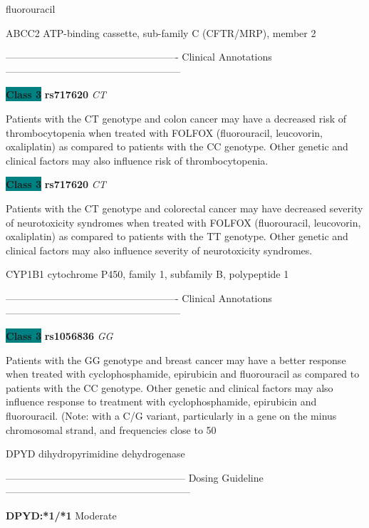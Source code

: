 \documentclass{resume} %
\begin{document}
\begin{rSection}{ fluorouracil }
\begin{rSubsection}{ ABCC2 }{ ATP-binding cassette, sub-family C (CFTR/MRP), member 2 }{}{}
\item[] ---------------------------------------------------- Clinical Annotations -----------------------------------------------------\newline
\item \textbf{\colorbox{teal} {Class 3}} \textbf{ rs717620 } \textit{ CT }
\item[] Patients with the CT genotype and colon cancer may have a decreased risk of thrombocytopenia when treated with FOLFOX (fluorouracil, leucovorin, oxaliplatin) as compared to patients with the CC genotype. Other genetic and clinical factors may also influence risk of thrombocytopenia.\item \textbf{\colorbox{teal} {Class 3}} \textbf{ rs717620 } \textit{ CT }
\item[] Patients with the CT genotype and colorectal cancer may have decreased severity of neurotoxicity syndromes when treated with FOLFOX (fluorouracil, leucovorin, oxaliplatin) as compared to patients with the TT genotype. Other genetic and clinical factors may also influence severity of neurotoxicity syndromes.
\end{rSubsection}\begin{rSubsection}{ CYP1B1 }{ cytochrome P450, family 1, subfamily B, polypeptide 1 }{}{}
\item[]

\item[] ---------------------------------------------------- Clinical Annotations -----------------------------------------------------\newline
\item \textbf{\colorbox{teal} {Class 3}} \textbf{ rs1056836 } \textit{ GG }
\item[] Patients with the GG genotype and breast cancer may have a better response when treated with cyclophosphamide, epirubicin and fluorouracil as compared to patients with the CC genotype. Other genetic and clinical factors may also influence response to treatment with cyclophosphamide, epirubicin and fluorouracil.  (Note: with a C/G variant, particularly in a gene on the minus chromosomal strand, and frequencies close to 50%
\end{rSubsection}\begin{rSubsection}{ DPYD }{ dihydropyrimidine dehydrogenase }{}{}
\item[]
\item[] ------------------------------------------------------ Dosing Guideline --------------------------------------------------------\newline
\item[]
\item[] \textbf{ DPYD:*1/*1 } Moderate


\end{rSubsection}
\end{rSection}
\end{document}
